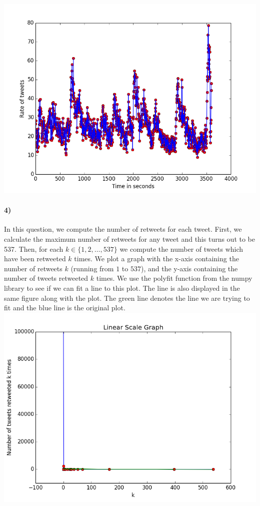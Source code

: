 \documentclass{article}
\begin{document}
\includegraphics[scale=0.6]{Q3b_plot1} 

\paragraph{4)}
In this question, we compute the number of retweets for each tweet. First, we calculate the maximum number of retweets
for any tweet and this turns out to be 537. Then, for each $k \in \{1,2,\ldots,537\}$ we compute the number of 
tweets which have been retweeted $k$ times. We plot a graph with the x-axis containing the 
number of retweets $k$ (running from $1$ to $537$), and the y-axis containing the number of tweets retweeted $k$ times.
We use the polyfit function from the numpy library to see if we can fit a line to this plot.
The line is also displayed in the same figure along with the plot. The green line denotes the line we are
trying to fit and the blue line is the original plot.\\
\includegraphics[scale=0.6]{4linear}\\ 
\end{document}

